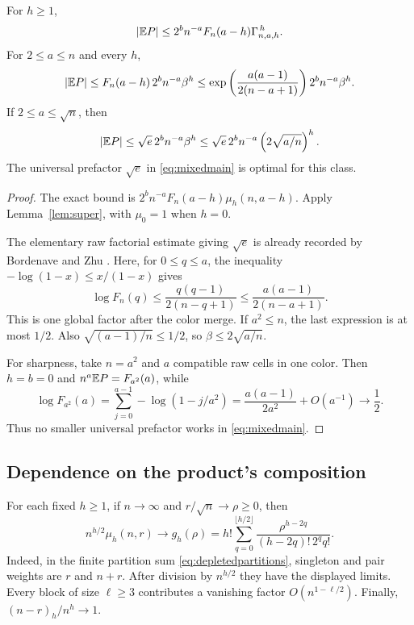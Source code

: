 \begin{corollary}\label{cor:mixedscalar}
For $h\ge1$,
\begin{equation}\label{eq:mixedgamma}
|\mathbb E P|\le 2^b n^{-a}F_n(a-h)\Gamma_{n,a,h}^{\,h}.
\end{equation}
For $2\le a\le n$ and every $h$,
\begin{equation}\label{eq:mixedgeneral}
|\mathbb E P|\le F_n(a-h)\,2^b n^{-a}\beta^h
\le\exp\left(\frac{a(a-1)}{2(n-a+1)}\right)2^bn^{-a}\beta^h.
\end{equation}
If $2\le a\le\sqrt n$, then
\begin{equation}\label{eq:mixedmain}
|\mathbb E P|\le\sqrt e\,2^b n^{-a}\beta^h
\le\sqrt e\,2^b n^{-a}\left(2\sqrt{a/n}\right)^h.
\end{equation}
The universal prefactor $\sqrt e$ in \eqref{eq:mixedmain} is optimal for this class.
\end{corollary}
\begin{proof}
The exact bound is $2^bn^{-a}F_n(a-h)\mu_h(n,a-h)$. Apply Lemma~\ref{lem:super}, with $\mu_0=1$ when $h=0$.

The elementary raw factorial estimate giving $\sqrt e$ is already recorded by Bordenave and Zhu \cite[Lemma 2.1, equation (2.3)]{BZ}. Here, for $0\le q\le a$, the inequality $-\log(1-x)\le x/(1-x)$ gives
\[
\log F_n(q)\le\frac{q(q-1)}{2(n-q+1)}
\le\frac{a(a-1)}{2(n-a+1)}.
\]
This is one global factor after the color merge. If $a^2\le n$, the last expression is at most $1/2$. Also $\sqrt{(a-1)/n}\le1/2$, so $\beta\le2\sqrt{a/n}$.

For sharpness, take $n=a^2$ and $a$ compatible raw cells in one color. Then $h=b=0$ and $n^a\mathbb E P=F_{a^2}(a)$, while
\[
\log F_{a^2}(a)=
\sum_{j=0}^{a-1}-\log(1-j/a^2)
=\frac{a(a-1)}{2a^2}+O(a^{-1})\longrightarrow\frac12.
\]
Thus no smaller universal prefactor works in \eqref{eq:mixedmain}.
\end{proof}

\subsection{Dependence on the product's composition}

For each fixed $h\ge1$, if $n\to\infty$ and $r/\sqrt n\to\rho\ge0$, then
\begin{equation}\label{eq:mixedfixedh}
n^{h/2}\mu_h(n,r)\longrightarrow
g_h(\rho)=h!\sum_{q=0}^{\lfloor h/2\rfloor}
\frac{\rho^{h-2q}}{(h-2q)!\,2^q q!}.
\end{equation}
Indeed, in the finite partition sum \eqref{eq:depletedpartitions}, singleton and pair weights are $r$ and $n+r$. After division by $n^{h/2}$ they have the displayed limits. Every block of size $\ell\ge3$ contributes a vanishing factor $O(n^{1-\ell/2})$. Finally, $(n-r)_h/n^h\to1$.

